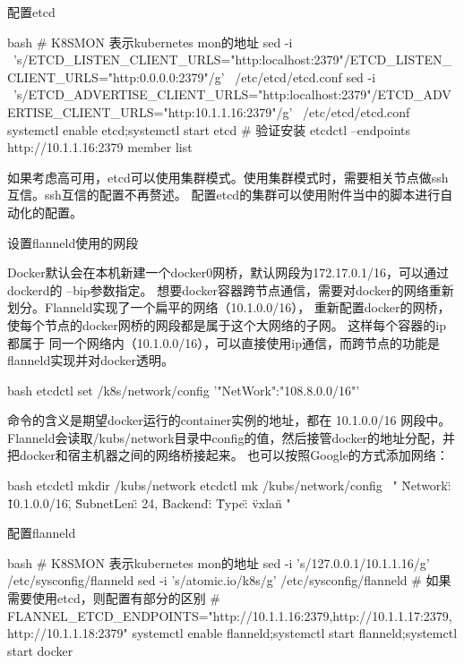 \begin{outline}[enumerate]
  \1 配置etcd
\begin{code-in-enumerate}{bash}
# K8SMON 表示kubernetes mon的地址
sed -i \
    's/ETCD_LISTEN_CLIENT_URLS="http:\/\/localhost:2379"/ETCD_LISTEN_CLIENT_URLS="http:\/\/0.0.0.0:2379"/g' \
    /etc/etcd/etcd.conf
sed -i \
    's/ETCD_ADVERTISE_CLIENT_URLS="http:\/\/localhost:2379"/ETCD_ADVERTISE_CLIENT_URLS="http:\/\/10.1.1.16:2379"/g' \
    /etc/etcd/etcd.conf
systemctl enable etcd;systemctl start etcd
# 验证安装
etcdctl --endpoints http://10.1.1.16:2379 member list
\end{code-in-enumerate}
如果考虑高可用，etcd可以使用集群模式。使用集群模式时，需要相关节点做ssh互信。ssh互信的配置不再赘述。
配置etcd的集群可以使用附件当中的脚本进行自动化的配置。


  \1 设置flanneld使用的网段

Docker默认会在本机新建一个docker0网桥，默认网段为172.17.0.1/16，可以通过dockerd的 --bip参数指定。
想要docker容器跨节点通信，需要对docker的网络重新划分。Flanneld实现了一个扁平的网络（10.1.0.0/16），
重新配置docker的网桥，使每个节点的docker网桥的网段都是属于这个大网络的子网。 这样每个容器的ip都属于
同一个网络内（10.1.0.0/16），可以直接使用ip通信，而跨节点的功能是flanneld实现并对docker透明。
\begin{code-in-enumerate}{bash}
etcdctl set /k8s/network/config '{"NetWork":"108.8.0.0/16"}'
\end{code-in-enumerate}
命令的含义是期望docker运行的container实例的地址，都在 10.1.0.0/16 网段中。
Flanneld会读取/kubs/network目录中config的值，然后接管docker的地址分配，并把docker和宿主机器之间的网络桥接起来。
也可以按照Google的方式添加网络：
\begin{code-in-enumerate}{bash}
etcdctl mkdir /kubs/network
etcdctl mk /kubs/network/config \
    "{ \"Network\": \"10.1.0.0/16\", \"SubnetLen\": 24, \"Backend\": { \"Type\": \"vxlan\" } }"
\end{code-in-enumerate}

  \1 配置flanneld
\begin{code-in-enumerate}{bash}
# K8SMON 表示kubernetes mon的地址
sed -i 's/127.0.0.1/10.1.1.16/g' /etc/sysconfig/flanneld
sed -i 's/atomic.io/k8s/g' /etc/sysconfig/flanneld
# 如果需要使用etcd，则配置有部分的区别
# FLANNEL_ETCD_ENDPOINTS="http://10.1.1.16:2379,http://10.1.1.17:2379,http://10.1.1.18:2379"
systemctl enable flanneld;systemctl start flanneld;systemctl start docker
\end{code-in-enumerate}


\end{outline}
